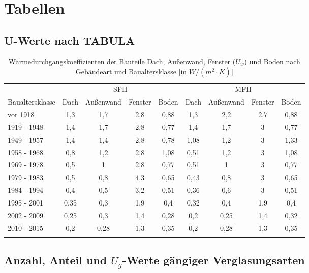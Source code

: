 \chapter{Tabellen}


\section{U-Werte nach TABULA}

\begin{table}[H]\centering
\begin{tabular}{lcccc|cccc}
\toprule[1.5pt]
 & \multicolumn{4}{c}{SFH}& \multicolumn{4}{c}{MFH}  \\ 
\cmidrule[1.5pt]{2-9}
Baualtersklasse & Dach & Außenwand & Fenster & Boden & Dach & Außenwand & Fenster & Boden \\ \addlinespace[5pt]
\midrule[2pt]
vor 1918 & 1,3 & 1,7 & 2,8 & 0,88 & 1,3 & 2,2 & 2,7 & 0,88 \\
\midrule
1919 - 1948 & 1,4 & 1,7 & 2,8 & 0,77 & 1,4 & 1,7 & 3 & 0,77 \\
\midrule
1949 - 1957 & 1,4 & 1,4 & 2,8 & 0,78 & 1,08 & 1,2 & 3 & 1,33 \\
\midrule
1958 - 1968 & 0,8 & 1,2 & 2,8 & 1,08 & 0,51 & 1,2 & 3 & 1,08 \\
\midrule
1969 - 1978 & 0,5 & 1 & 2,8 & 0,77 & 0,51 & 1 & 3 & 0,77 \\
\midrule
1979 - 1983 & 0,5 & 0,8 & 4,3 & 0,65 & 0,43 & 0,8 & 3 & 0,65 \\
\midrule
1984 - 1994 & 0,4 & 0,5 & 3,2 & 0,51 & 0,36 & 0,6 & 3 & 0,51 \\
\midrule
1995 - 2001 & 0,35 & 0,3 & 1,9 & 0,4 & 0,32 & 0,4 & 1,9 & 0,4 \\
\midrule
2002 - 2009 & 0,25 & 0,3 & 1,4 & 0,28 & 0,2 & 0,25 & 1,4 & 0,32 \\
\midrule
2010 - 2015 & 0,2 & 0,28 & 1,3 & 0,35 & 0,2 & 0,28 & 1,3 & 0,35 \\
\bottomrule[1.5pt] \addlinespace[10pt]
\end{tabular}
\caption{Wärmedurchgangskoeffizienten der Bauteile Dach, Außenwand, Fenster (\(U_w\)) und Boden nach Gebäudeart und Baualtersklasse [in \(W/(m^2 \cdot K)\)]}
\label{tab: TabelleA1}
\end{table}

\section{Anzahl, Anteil und \(U_g\)-Werte gängiger Verglasungsarten}

